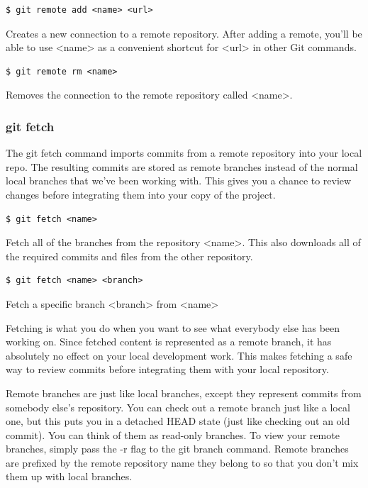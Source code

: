 \documentclass{article}
\begin{document}
\begin{lstlisting}
$ git remote add <name> <url>
\end{lstlisting}

Creates a new connection to a remote repository. After adding a remote,
you'll be able to use <name> as a convenient shortcut for <url> in
other Git commands.

\begin{lstlisting}
$ git remote rm <name>
\end{lstlisting}

Removes the connection to the remote repository called <name>.

\subsubsection*{git fetch}

The git fetch command imports commits from a remote repository into
your local repo. The resulting commits are stored as remote branches
instead of the normal local branches that we've been working
with. This gives you a chance to review changes before integrating
them into your copy of the project.

\begin{lstlisting}
$ git fetch <name>
\end{lstlisting}

Fetch all of the branches from the repository <name>. This also downloads all
of the required commits and files from the other repository.

\begin{lstlisting}
$ git fetch <name> <branch>
\end{lstlisting}

Fetch a specific branch <branch> from <name>

Fetching is what you do when you want to see what everybody else has
been working on. Since fetched content is represented as a remote
branch, it has absolutely no effect on your local development
work. This makes fetching a safe way to review commits before
integrating them with your local repository.

Remote branches are just like local branches, except they represent
commits from somebody else's repository. You can check out a remote
branch just like a local one, but this puts you in a detached HEAD
state (just like checking out an old commit). You can think of them as
read-only branches. To view your remote branches, simply pass the -r
flag to the git branch command. Remote branches are prefixed by the
remote repository name they belong to so that you don't mix them up with local
branches.
\end{document}
